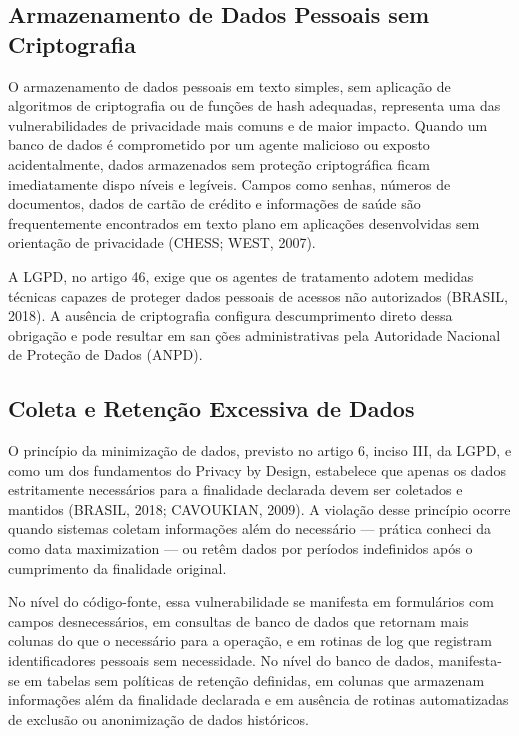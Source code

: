 \documentclass[oneside]{normas-utf-tex}
\begin{document}
\subsection{Armazenamento de Dados Pessoais sem Criptografia}

O armazenamento de dados pessoais em texto simples, sem aplicação de algoritmos de criptografia ou de funções de hash adequadas, representa uma das vulnerabilidades de privacidade mais comuns e de maior impacto. Quando um banco de dados é comprometido por um agente malicioso ou exposto acidentalmente, dados armazenados sem proteção criptográfica ficam imediatamente dispo níveis e legíveis. Campos como senhas, números de documentos, dados de cartão de crédito e informações de saúde são frequentemente encontrados em texto plano em aplicações desenvolvidas sem orientação de privacidade (CHESS; WEST, 2007).

A LGPD, no artigo 46, exige que os agentes de tratamento adotem medidas técnicas capazes de proteger dados pessoais de acessos não autorizados (BRASIL, 2018). A ausência de criptografia configura descumprimento direto dessa obrigação e pode resultar em san ções administrativas pela Autoridade Nacional de Proteção de Dados (ANPD).

\subsection{Coleta e Retenção Excessiva de Dados}

O princípio da minimização de dados, previsto no artigo 6, inciso III, da LGPD, e como um dos fundamentos do Privacy by Design, estabelece que apenas os dados estritamente necessários para a finalidade declarada devem ser coletados e mantidos (BRASIL, 2018; CAVOUKIAN, 2009). A violação desse princípio ocorre quando sistemas coletam informações além do necessário — prática conheci da como data maximization — ou retêm dados por períodos indefinidos após o cumprimento da finalidade original.

No nível do código-fonte, essa vulnerabilidade se manifesta em formulários com campos desnecessários, em consultas de banco de dados que retornam mais colunas do que o necessário para a operação, e em rotinas de log que registram identificadores pessoais sem necessidade. No nível do banco de dados, manifesta-se em tabelas sem políticas de retenção definidas, em colunas que armazenam informações além da finalidade declarada e em ausência de rotinas automatizadas de exclusão ou anonimização de dados históricos.
\end{document}
